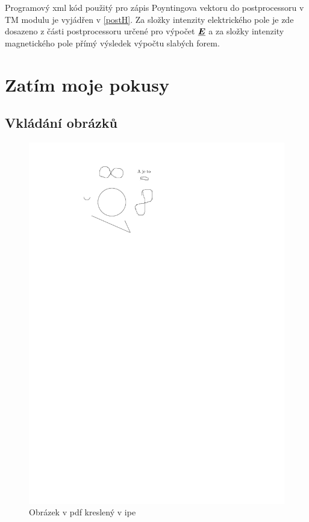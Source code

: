 \documentclass[12pt,a4paper,oneside]{article}
\numberwithin{equation}{section} %
\numberwithin{figure}{section} %
\numberwithin{table}{section} %
\renewcommand{\vec}[1]{\mbox{\boldmath$#1$}} %
\newcommand{\faz}[1]{{\underline{#1}}} %
\begin{document}
Programový xml kód použitý pro zápis Poyntingova vektoru do postprocessoru v TM modulu je vyjádřen v \ref{postH}. Za složky intenzity elektrického pole je zde dosazeno z části postprocessoru určené pro výpočet $\faz{\vec{E}}$ a za složky intenzity magnetického pole přímý výsledek výpočtu slabých forem.





\clearpage
\section{Zatím moje pokusy}
\subsection{Vkládání obrázků}
\begin{figure}[h] %
\begin{center}
\includegraphics{Obrzkusmo.pdf}
\caption{Obrázek v pdf kreslený v ipe} %
\end{center}
\end{figure}
\end{document}
